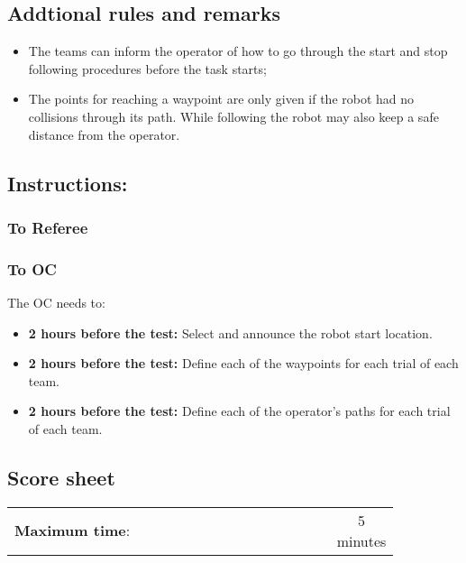 \subsection*{Addtional rules and remarks}
\begin{itemize}[nosep]
	\item The teams can inform the operator of how to go through the start and stop following procedures before the task starts;
	\item The points for reaching a waypoint are only given if the robot had no collisions through its path. While following the robot may also keep a safe distance from the operator.
\end{itemize}

\subsection*{Instructions:}
\subsubsection*{To Referee}


\subsubsection*{To OC}
The OC needs to:
\begin{itemize}
	\item \textbf{2 hours before the test:} Select and announce the robot start location.
	\item \textbf{2 hours before the test:} Define each of the waypoints for each trial of each team.
    \item \textbf{2 hours before the test:} Define each of the operator's paths for each trial of each team.
\end{itemize}

\newpage
\subsection*{Score sheet}

\begin{table}[h]
	\begin{tabular}{m{0.85\linewidth} c}
		\textbf{Maximum time}: & 5 minutes \\
	\end{tabular}
\end{table}

